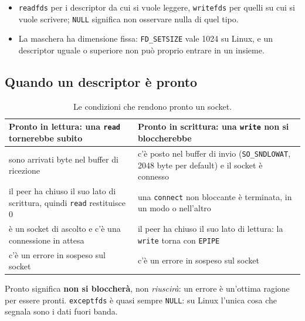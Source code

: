\begin{itemize}
    \item \texttt{readfds} per i descriptor da cui si vuole leggere, \texttt{writefds} per quelli su cui si vuole scrivere;
          \texttt{NULL} significa non osservare nulla di quel tipo.
    \item La maschera ha dimensione fissa: \texttt{FD\_SETSIZE} vale 1024 su Linux, e un descriptor uguale o superiore non
          può proprio entrare in un insieme.
\end{itemize}

\subsection{Quando un descriptor è pronto}

\begin{table}[H]
\centering
\begin{tabular}{p{} p{}}
\toprule
\textbf{Pronto in lettura}: una \texttt{read} tornerebbe subito & \textbf{Pronto in scrittura}: una \texttt{write} non si
                                                                    bloccherebbe \\
\midrule
sono arrivati byte nel buffer di ricezione & c'è posto nel buffer di invio (\texttt{SO\_SNDLOWAT}, 2048 byte per
                                             default) e il socket è connesso \\
il peer ha chiuso il suo lato di scrittura, quindi \texttt{read} restituisce 0 & una \texttt{connect} non bloccante è
                                                                                  terminata, in un modo o nell'altro \\
è un socket di ascolto e c'è una connessione in attesa & il peer ha chiuso il suo lato di lettura: la \texttt{write}
                                                          torna con \texttt{EPIPE} \\
c'è un errore in sospeso sul socket & c'è un errore in sospeso sul socket \\
\bottomrule
\end{tabular}
\caption{Le condizioni che rendono pronto un socket.}
\end{table}

Pronto significa \textbf{non si bloccherà}, non \emph{riuscirà}: un errore è un'ottima ragione per essere pronti.
\texttt{exceptfds} è quasi sempre \texttt{NULL}: su Linux l'unica cosa che segnala sono i dati fuori banda.

